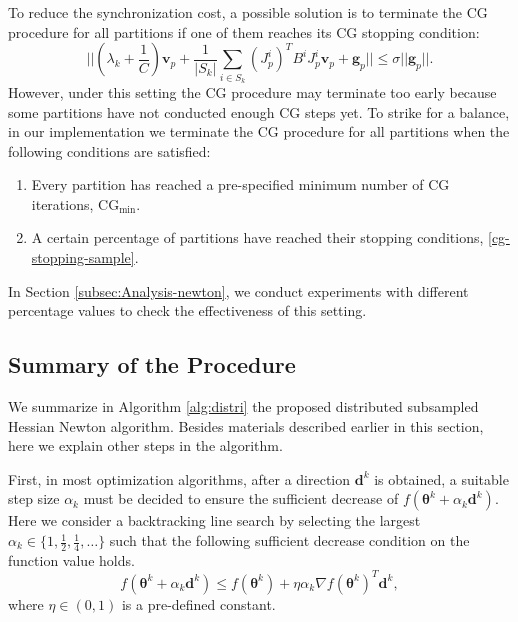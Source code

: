 \documentclass[12pt]{article}
\def\bv{{\boldsymbol v}}
\def\bd{{\boldsymbol d}}
\def\bg{{\boldsymbol g}}
\def\btheta{\boldsymbol \theta}
\begin{document}
\par To reduce the synchronization cost, a possible solution is to terminate the CG procedure for all partitions if one of them reaches its CG stopping condition:
\begin{equation}
\label{cg-stopping-sample}
||(\lambda_k + \frac{1}{C}) \bv_p + \frac{1}{|S_k|}\sum_{i \in S_k} (J^i_p)^T B^i J^i_p\bv_p + \bg_p|| \leq \sigma ||\bg_p||.
\end{equation}
However, under this setting the CG procedure may terminate too early because some partitions have not conducted enough CG steps yet. To strike for a balance, in our implementation we terminate the CG procedure for all partitions when the following conditions are satisfied:
\begin{enumerate}[1.]
	\item Every partition has reached a pre-specified minimum number of CG iterations, $\text{CG}_{\text{min}}$.
	\item A certain percentage of partitions have reached their stopping conditions, \eqref{cg-stopping-sample}.
\end{enumerate}
In Section \ref{subsec:Analysis-newton}, we conduct experiments with different percentage values to check the effectiveness of this setting.

\subsection{Summary of the Procedure}
\label{subsec:summary-procedure}
We summarize in Algorithm \ref{alg:distri} the proposed distributed subsampled Hessian Newton algorithm. Besides materials described earlier in this section, here we explain other steps in the algorithm.

First, in most optimization algorithms, after a direction $\bd^k$ is obtained, a suitable step size $\alpha_k$ must be decided to ensure the sufficient decrease of $f(\btheta^k + \alpha_k \bd^k)$. Here we consider a backtracking line search by selecting the largest $\alpha_k \in \{1, \frac{1}{2}, \frac{1}{4}, \ldots\}$ such that the following sufficient decrease condition on the function value holds.
\begin{equation}
\label{linesearch-condition}
f(\btheta^{k} + \alpha_k \bd^k) \leq f(\btheta^k) + \eta \alpha_k \nabla f(\btheta^k)^T \bd^k,
\end{equation}
where $\eta \in (0,1)$ is a pre-defined constant.
\end{document}
